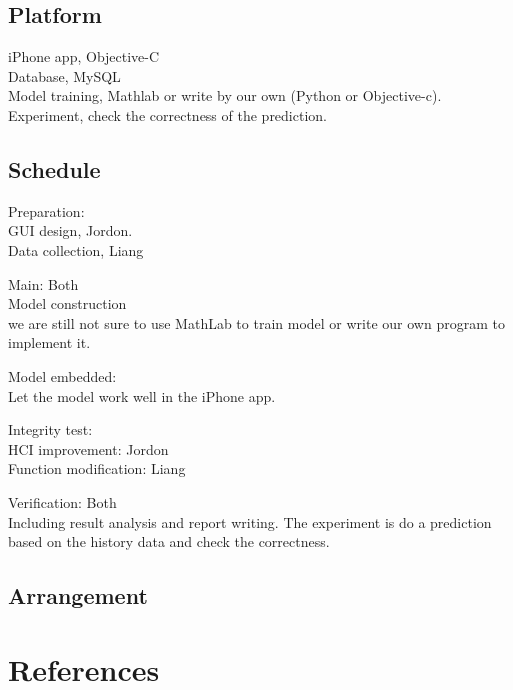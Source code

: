 \documentclass[12pt]{article}
\begin{document}
\subsection{Platform}
iPhone app, Objective-C\\
Database, MySQL\\
Model training, Mathlab or write by our own (Python or Objective-c).\\
Experiment, check the correctness of the prediction.\\

\subsection{Schedule}
Preparation: \\
    GUI design, Jordon. \\
    Data collection, Liang

Main: Both\\
    Model construction \\  
    we are still not sure to use MathLab to train model or write our
    own program to implement it.

    Model embedded: \\
    Let the model work well in the iPhone app.

Integrity test: \\
    HCI improvement: Jordon \\ 
    Function modification:  Liang 

Verification: Both\\
    Including result analysis and report writing. The experiment is do
    a prediction based on the history data and check the correctness.

\subsection{Arrangement}
  \begin{gantt}{7}{8}
    \begin{ganttitle}
    \end{ganttitle}
  \end{gantt}


\section{References}

\end{document}
